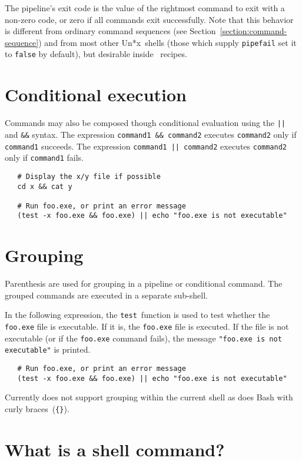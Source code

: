 The pipeline's exit code is the value of the rightmost command to exit with a non-zero code, or zero
if all commands exit successfully.  Note that this behavior is different from ordinary command
sequences (see Section~\ref{section:command-sequence}) and from most other Un*x~shells (those which
supply \verb+pipefail+ set it to \verb+false+ by default), but desirable inside
\OMake~recipes.

\section{Conditional execution}

Commands may also be composed though conditional evaluation using the \verb+||+ and \verb+&&+
syntax.  The expression \verb+command1 && command2+ executes \verb+command2+ only if \verb+command1+
succeeds.  The expression \verb+command1 || command2+ executes \verb+command2+ only if
\verb+command1+ fails.

\begin{verbatim}
   # Display the x/y file if possible
   cd x && cat y

   # Run foo.exe, or print an error message
   (test -x foo.exe && foo.exe) || echo "foo.exe is not executable"
\end{verbatim}

\section{Grouping}

Parenthesis are used for grouping in a pipeline or conditional command.  The grouped commands are
executed in a separate sub-shell.

In the following expression, the \verb+test+~function is used to test whether the \verb+foo.exe+
file is executable.  If it is, the \verb+foo.exe+ file is executed.  If the file is not executable
(or if the \verb+foo.exe+ command fails), the message \verb+"foo.exe is not executable"+ is printed.

\begin{verbatim}
   # Run foo.exe, or print an error message
   (test -x foo.exe && foo.exe) || echo "foo.exe is not executable"
\end{verbatim}

Currently  does not support grouping within the current shell as does Bash with curly
braces~(\verb+{}+).

\section{What is a shell command?}

